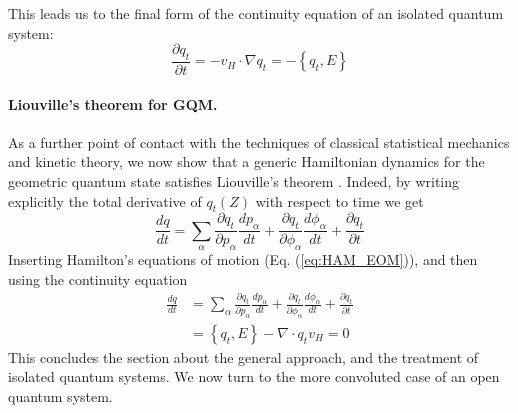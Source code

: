 \documentclass[draft,nofootinbib,pre,twocolumn,showpacs,showkeys,preprintnumbers,floatfix]{revtex4-1}
\newcommand{\1}{\mathbbm{1}}
\begin{document}
This leads us to the final form of the continuity equation of an isolated quantum system:
\begin{equation}
\frac{\partial q_t}{\partial t} = - v_H \cdot \nabla q_t = -\left\{ q_t, E \right\}
\end{equation}

\paragraph*{Liouville's theorem for GQM.} As a further point of contact with the techniques of classical 
statistical mechanics and kinetic theory, we now show that a generic Hamiltonian dynamics for the 
geometric quantum state satisfies Liouville's theorem \cite{Soto16}. Indeed, by writing explicitly the total 
derivative of $q_t(Z)$ with respect to time we get 
\begin{equation}
\frac{d q}{d t} = \sum_\alpha \frac{\partial q_t}{\partial p_\alpha} \frac{dp_\alpha}{dt}+\frac{\partial q_t}{\partial \phi_\alpha} \frac{d\phi_\alpha}{dt} + \frac{\partial q_t}{\partial t}
\end{equation}
Inserting Hamilton's equations of motion (Eq. (\ref{eq:HAM_EOM})), and then using the continuity equation
\begin{align}
\frac{d q}{d t} &= \sum_\alpha \frac{\partial q_t}{\partial p_\alpha} \frac{dp_\alpha}{dt}+\frac{\partial q_t}{\partial \phi_\alpha} \frac{d\phi_\alpha}{dt} + \frac{\partial q_t}{\partial t}\nonumber \\
& = \left\{ q_t, E\right\} - \nabla \cdot q_t v_H = 0
\end{align}
This concludes the section about the general approach, and the treatment of isolated quantum systems.
We now turn to the more convoluted case of an open quantum system.


%
\end{document}
